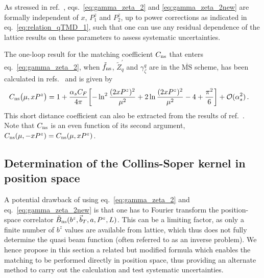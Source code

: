 \documentclass[11pt,a4paper]{article}
\DeclareRobustCommand{\eq}[1]{eq.~\eqref{eq:#1}}
\DeclareRobustCommand{\eqs}[2]{eqs.~\eqref{eq:#1} and \eqref{eq:#2}}
\DeclareRobustCommand{\mycite}[1]{ref.~\cite{#1}}
\DeclareRobustCommand{\mycites}[1]{refs.~\cite{#1}}
\newcommand{\MS}{{\overline{\mathrm{MS}}}}
\newcommand{\cO}{\mathcal{O}}
\newcommand{\as}{\alpha_s}
\newcommand{\ns}{{\rm ns}}
\begin{document}
As stressed in \mycite{Ebert:2018gzl}, \eqs{gamma_zeta_2}{gamma_zeta_2new} are formally independent of $x$, $P_1^z$ and $P_2^z$, up to power corrections as indicated in \eq{relation_qTMD_1}, such that one can use any residual dependence of the lattice results
on these parameters to assess systematic uncertainties.


The one-loop result for the matching coefficient $C_\ns$ that enters \eq{gamma_zeta_2}, 
when $\tilde f_{\rm ns}$, $\tilde Z_q^\prime$ and $\gamma_\zeta^q$ are in the $\MS$ scheme,
has been calculated in \mycites{Ebert:2018gzl,Ebert:2019okf} and is given by
\begin{align} \label{eq:C_nlo}
 C_{\ns}\bigl(\mu, x P^z\bigr) &
 = 1 + \frac{\as C_F}{4\pi} \biggl[ - \ln^2\frac{(2 x P^z)^2}{\mu^2}
     + 2 \ln\frac{(2 x P^z)^2}{\mu^2} -4 + \frac{\pi^2}{6} \biggr] + \cO(\as^2)
\,.\end{align}
This short distance coefficient can also be extracted from the results of \mycite{Ji:2018hvs}.
Note that $C_{\ns}$ is an even function of its second argument, $C_{\ns}(\mu,-xP^z) = C_{\ns}(\mu,xP^z)$.

\subsection{Determination of the Collins-Soper kernel in position space}
\label{sec:CS_position_space}

A potential drawback of using \eq{gamma_zeta_2} and \eq{gamma_zeta_2new} is that one has to Fourier transform
the position-space correlator $\tilde B_{\ns}(b^z,\vec b_T,a,P^z,L)$.
This can be a limiting factor, as only a finite number of $b^z$ values are available from lattice, which thus does not fully determine the quasi beam function (often referred to as an inverse problem).
We hence propose in this section a related but modified formula which enables the matching to be performed directly in position space, thus providing an alternate method to carry out the calculation and test systematic uncertainties.
\end{document}
